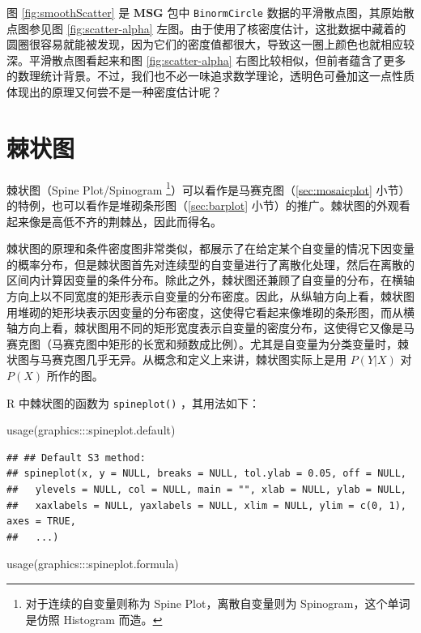 \documentclass[
  b5paper,
  UTF8,twoside]{book}
\newenvironment{Shaded}{\begin{snugshade}}{\end{snugshade}}
\newcommand{\FunctionTok}[1]{\textcolor[rgb]{0.00,0.00,0.00}{#1}}
\newcommand{\NormalTok}[1]{#1}
\newcommand{\SpecialCharTok}[1]{\textcolor[rgb]{0.00,0.00,0.00}{#1}}
\begin{document}
图 \ref{fig:smoothScatter} 是 \textbf{MSG} 包中 \texttt{BinormCircle} 数据的平滑散点图，其原始散点图参见图 \ref{fig:scatter-alpha} 左图。由于使用了核密度估计，这批数据中藏着的圆圈很容易就能被发现，因为它们的密度值都很大，导致这一圈上颜色也就相应较深。平滑散点图看起来和图 \ref{fig:scatter-alpha} 右图比较相似，但前者蕴含了更多的数理统计背景。不过，我们也不必一味追求数学理论，透明色可叠加这一点性质体现出的原理又何尝不是一种密度估计呢？

\hypertarget{sec:spineplot}{%
\section{棘状图}\label{sec:spineplot}}

棘状图（Spine Plot/Spinogram \footnote{对于连续的自变量则称为 Spine Plot，离散自变量则为 Spinogram，这个单词是仿照 Histogram 而造。}）可以看作是马赛克图（\ref{sec:mosaicplot} 小节）的特例，也可以看作是堆砌条形图（\ref{sec:barplot} 小节）的推广。棘状图的外观看起来像是高低不齐的荆棘丛，因此而得名。

棘状图的原理和条件密度图非常类似，都展示了在给定某个自变量的情况下因变量的概率分布，但是棘状图首先对连续型的自变量进行了离散化处理，然后在离散的区间内计算因变量的条件分布。除此之外，棘状图还兼顾了自变量的分布，在横轴方向上以不同宽度的矩形表示自变量的分布密度。因此，从纵轴方向上看，棘状图用堆砌的矩形块表示因变量的分布密度，这使得它看起来像堆砌的条形图，而从横轴方向上看，棘状图用不同的矩形宽度表示自变量的密度分布，这使得它又像是马赛克图（马赛克图中矩形的长宽和频数成比例）。尤其是自变量为分类变量时，棘状图与马赛克图几乎无异。从概念和定义上来讲，棘状图实际上是用 \(P(Y|X)\) 对 \(P(X)\) 所作的图。

R 中棘状图的函数为 \texttt{spineplot()} ，其用法如下：

\begin{Shaded}
\begin{Highlighting}[]
\FunctionTok{usage}\NormalTok{(graphics}\SpecialCharTok{:::}\NormalTok{spineplot.default)}
\end{Highlighting}
\end{Shaded}

\begin{verbatim}
## ## Default S3 method:
## spineplot(x, y = NULL, breaks = NULL, tol.ylab = 0.05, off = NULL,
##   ylevels = NULL, col = NULL, main = "", xlab = NULL, ylab = NULL,
##   xaxlabels = NULL, yaxlabels = NULL, xlim = NULL, ylim = c(0, 1), axes = TRUE,
##   ...)
\end{verbatim}

\begin{Shaded}
\begin{Highlighting}[]
\FunctionTok{usage}\NormalTok{(graphics}\SpecialCharTok{:::}\NormalTok{spineplot.formula)}
\end{Highlighting}
\end{Shaded}
\end{document}
